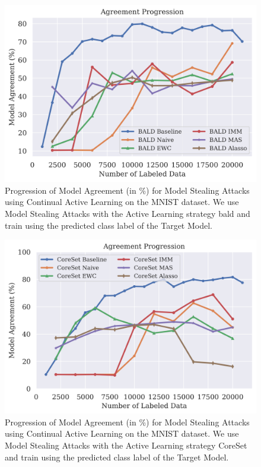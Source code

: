 \begin{figure}[h]
    \centering
    \includegraphics[width=0.7\linewidth]{images/results_CALMS/mnist_label_bald.png}
    \caption[Accuracy Comparison for Model Stealing on MNIST using the predicted class label and the Active Learning strategy BALD]{Progression of Model Agreement
    (in \%) for Model Stealing Attacks using Continual Active Learning on the MNIST dataset. We use Model Stealing Attacks with the Active Learning strategy
    \gls{bald} and train using the predicted class label of the Target Model.}
    \label{fig:CALMSMNISTLabelBALD}
\end{figure}

\begin{figure}[h]
    \centering
    \includegraphics[width=0.7\linewidth]{images/results_CALMS/mnist_label_coreset.png}
    \caption[Agreement Comparison for Model Stealing on MNIST using the predicted class label and the Active Learning strategy CoreSet]{Progression of Model Agreement
    (in \%) for Model Stealing Attacks using Continual Active Learning on the MNIST dataset. We use Model Stealing Attacks with the Active Learning strategy
    CoreSet and train using the predicted class label of the Target Model.}
    \label{fig:CALMSMNISTLabelCoreSet}
\end{figure}

